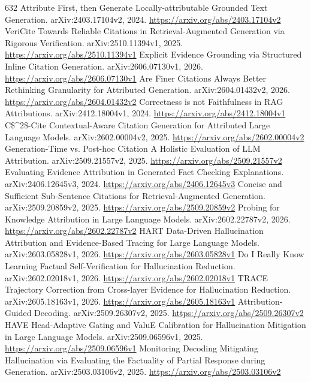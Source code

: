 \documentclass[11pt]{article}
\begin{document}
\begin{thebibliography}{632}
 Attribute First, then Generate Locally-attributable Grounded Text Generation. arXiv:2403.17104v2, 2024. \url{https://arxiv.org/abs/2403.17104v2}
 VeriCite Towards Reliable Citations in Retrieval-Augmented Generation via Rigorous Verification. arXiv:2510.11394v1, 2025. \url{https://arxiv.org/abs/2510.11394v1}
 Explicit Evidence Grounding via Structured Inline Citation Generation. arXiv:2606.07130v1, 2026. \url{https://arxiv.org/abs/2606.07130v1}
 Are Finer Citations Always Better Rethinking Granularity for Attributed Generation. arXiv:2604.01432v2, 2026. \url{https://arxiv.org/abs/2604.01432v2}
 Correctness is not Faithfulness in RAG Attributions. arXiv:2412.18004v1, 2024. \url{https://arxiv.org/abs/2412.18004v1}
 C\$\textasciicircum{}2\$-Cite Contextual-Aware Citation Generation for Attributed Large Language Models. arXiv:2602.00004v2, 2025. \url{https://arxiv.org/abs/2602.00004v2}
 Generation-Time vs. Post-hoc Citation A Holistic Evaluation of LLM Attribution. arXiv:2509.21557v2, 2025. \url{https://arxiv.org/abs/2509.21557v2}
 Evaluating Evidence Attribution in Generated Fact Checking Explanations. arXiv:2406.12645v3, 2024. \url{https://arxiv.org/abs/2406.12645v3}
 Concise and Sufficient Sub-Sentence Citations for Retrieval-Augmented Generation. arXiv:2509.20859v2, 2025. \url{https://arxiv.org/abs/2509.20859v2}
 Probing for Knowledge Attribution in Large Language Models. arXiv:2602.22787v2, 2026. \url{https://arxiv.org/abs/2602.22787v2}
 HART Data-Driven Hallucination Attribution and Evidence-Based Tracing for Large Language Models. arXiv:2603.05828v1, 2026. \url{https://arxiv.org/abs/2603.05828v1}
 Do I Really Know Learning Factual Self-Verification for Hallucination Reduction. arXiv:2602.02018v1, 2026. \url{https://arxiv.org/abs/2602.02018v1}
 TRACE Trajectory Correction from Cross-layer Evidence for Hallucination Reduction. arXiv:2605.18163v1, 2026. \url{https://arxiv.org/abs/2605.18163v1}
 Attribution-Guided Decoding. arXiv:2509.26307v2, 2025. \url{https://arxiv.org/abs/2509.26307v2}
 HAVE Head-Adaptive Gating and ValuE Calibration for Hallucination Mitigation in Large Language Models. arXiv:2509.06596v1, 2025. \url{https://arxiv.org/abs/2509.06596v1}
 Monitoring Decoding Mitigating Hallucination via Evaluating the Factuality of Partial Response during Generation. arXiv:2503.03106v2, 2025. \url{https://arxiv.org/abs/2503.03106v2}

\end{thebibliography}
\end{document}
